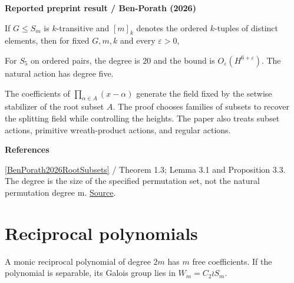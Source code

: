 \documentclass[11pt,a4paper,oneside,openany]{book}
\newcommand{\atlasdisplay}[1]{\par\begingroup\centering\vspace{3pt}\noindent\adjustbox{max width=\linewidth}{\(\displaystyle #1\)}\par\vspace{5pt}\endgroup}
\newenvironment{sources}{\par\smallskip\begingroup\footnotesize\color{atlasgray}\leftskip=10pt\setlength{\parskip}{2pt}}{\par\endgroup\smallskip}
\begin{document}
\begin{atlasblock}[standard]
\textbf{\sffamily Reported preprint result  /  Ben-Porath (2026)}\par\smallskip
\color{black} If \(G\le S_m\) is \(k\)-transitive and \([m]_k\) denotes the ordered \(k\)-tuples of distinct elements, then for fixed \(G,m,k\) and every \(\varepsilon>0\),\par

\atlasdisplay{|B(H;G,[m]_k)|\ll_{G,m,k,\varepsilon} H^{m+1+\varepsilon}.}
\end{atlasblock}\color{black}
\color{black} For \(S_5\) on ordered pairs, the degree is \(20\) and the bound is \(O_\varepsilon(H^{6+\varepsilon})\). The natural action has degree five.\par
\color{black} The coefficients of \(\prod_{\alpha\in A}(x-\alpha)\) generate the field fixed by the setwise stabilizer of the root subset \(A\). The proof chooses families of subsets to recover the splitting field while controlling the heights. The paper also treats subset actions, primitive wreath-product actions, and regular actions.\par
\begin{sources}
\textbf{References}\par\smallskip
\noindent\hyperlink{ref:BenPorath2026RootSubsets}{[BenPorath2026RootSubsets]} / Theorem 1.3; Lemma 3.1 and Proposition 3.3. The degree is the size of the specified permutation set, not the natural permutation degree m. \href{https://arxiv.org/abs/2603.14617}{Source}.\par
\end{sources}\color{black}
\section{Reciprocal polynomials}
\color{black} A monic reciprocal polynomial of degree \(2m\) has \(m\) free coefficients. If the polynomial is separable, its Galois group lies in \(W_m=C_2\wr S_m\).\par
\end{document}
